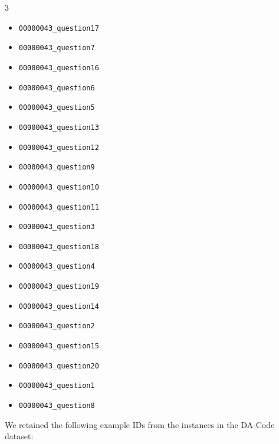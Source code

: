 \begin{multicols}{3}
\begin{itemize}[nosep, leftmargin=*]
        

        \item \texttt{00000043\_question17}
        \item \texttt{00000043\_question7}
        \item \texttt{00000043\_question16}
        \item \texttt{00000043\_question6}
        \item \texttt{00000043\_question5}
        \item \texttt{00000043\_question13}
        \item \texttt{00000043\_question12}
        \item \texttt{00000043\_question9}
        \item \texttt{00000043\_question10}
        \item \texttt{00000043\_question11}
        \item \texttt{00000043\_question3}
        \item \texttt{00000043\_question18}
        \item \texttt{00000043\_question4}
        \item \texttt{00000043\_question19}
        \item \texttt{00000043\_question14}
        \item \texttt{00000043\_question2}
        \item \texttt{00000043\_question15}
        \item \texttt{00000043\_question20}
        \item \texttt{00000043\_question1}
        \item \texttt{00000043\_question8}
    \end{itemize}
\end{multicols}

We retained the following example IDs from the instances in the DA-Code dataset:

